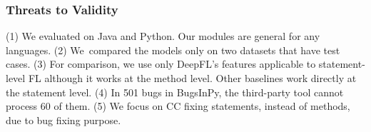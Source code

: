 \subsubsection{Threats to Validity}
(1) We evaluated {\tool} on Java and Python. Our modules are
general for any languages. (2)
We~compared the models only on two datasets that have test cases.
(3) For comparison, we use only DeepFL's features applicable to
statement-level FL although it works at the method level. Other
baselines work directly at the statement level.
(4) In 501 bugs in BugsInPy, the third-party tool cannot process 60
of them. (5) We focus on CC fixing statements, instead of 
methods, due to bug fixing purpose.





